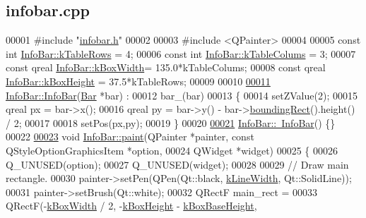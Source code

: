 \hypertarget{infobar_8cpp_source}{}\subsection{infobar.\+cpp}
\label{infobar_8cpp_source}

\begin{DoxyCode}
00001 \textcolor{preprocessor}{#include "\hyperlink{infobar_8h}{infobar.h}"}
00002 
00003 \textcolor{preprocessor}{#include <QPainter>}
00004 
00005 \textcolor{keyword}{const} \textcolor{keywordtype}{int} \hyperlink{class_info_bar_ad54d2dd19a63caf9d2476aace60ae3c5}{InfoBar::kTableRows}  = 4;
00006 \textcolor{keyword}{const} \textcolor{keywordtype}{int} \hyperlink{class_info_bar_a57e9e7c40a6fd2a56dd47a4512d65489}{InfoBar::kTableColums} = 3;
00007 \textcolor{keyword}{const} qreal \hyperlink{class_info_bar_aa1c35ddbae0324743d90721037447571}{InfoBar::kBoxWidth}= 135.0*kTableColums;
00008 \textcolor{keyword}{const} qreal \hyperlink{class_info_bar_aba381a3838a5e064f1372f2f2b4d8e0d}{InfoBar::kBoxHeight} = 37.5*kTableRows;
00009 
00010 
\hypertarget{infobar_8cpp_source_l00011}{}\hyperlink{class_info_bar_aab5c08f226901c8827a97efbdfb5122a}{00011} \hyperlink{class_info_bar_aab5c08f226901c8827a97efbdfb5122a}{InfoBar::InfoBar}(\hyperlink{class_bar}{Bar} *bar) :
00012   bar\_(bar)
00013 \{
00014   setZValue(2);
00015   qreal px = bar->x();
00016   qreal py = bar->y() - bar->\hyperlink{group___models_ga8279d8109019cc7e139e2023690496be}{boundingRect}().height() / 2;
00017 
00018   setPos(px,py);
00019 \}
00020 
\hypertarget{infobar_8cpp_source_l00021}{}\hyperlink{class_info_bar_a954baa28d750739c80c029818d267d8e}{00021} \hyperlink{class_info_bar_a954baa28d750739c80c029818d267d8e}{InfoBar::~InfoBar}() \{\}
00022 
\hypertarget{infobar_8cpp_source_l00023}{}\hyperlink{class_info_bar_afa011ce96bb99021d2cbf5b24c7276bb}{00023} \textcolor{keywordtype}{void} \hyperlink{class_info_bar_afa011ce96bb99021d2cbf5b24c7276bb}{InfoBar::paint}(QPainter *painter, \textcolor{keyword}{const} QStyleOptionGraphicsItem *option,
00024                     QWidget *widget)
00025 \{
00026   Q\_UNUSED(option);
00027   Q\_UNUSED(widget);
00028 
00029   \textcolor{comment}{// Draw main rectangle.}
00030   painter->setPen(QPen(Qt::black, \hyperlink{class_info_bar_a46d929f42476a6ad37422adee1783712}{kLineWidth}, Qt::SolidLine));
00031   painter->setBrush(Qt::white);
00032   QRectF main\_rect =
00033     QRectF(-\hyperlink{class_info_bar_aa1c35ddbae0324743d90721037447571}{kBoxWidth} / 2, -\hyperlink{class_info_bar_aba381a3838a5e064f1372f2f2b4d8e0d}{kBoxHeight} - \hyperlink{class_info_bar_a28fb5e5d6d399d9327f67aa768d4a3d8}{kBoxBaseHeight}, 

\end{DoxyCode}

